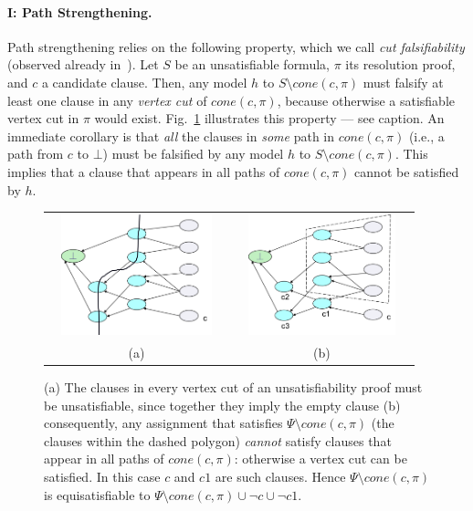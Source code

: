 \documentclass[twoside,11pt]{article}
\renewcommand\square{\bot}
\renewcommand\Pr{\pi}
\begin{document}
\algrenewcommand\algorithmicindent{1em}

\paragraph{I: Path Strengthening.} Path strengthening relies on
the following property, which we call \emph{cut falsifiability} (observed
already in~\cite{DHN06,NadelPhd}). Let $S$ be an unsatisfiable formula, $\pi$
its resolution proof, and $c$ a candidate clause.
Then, any model $h$ to $S \setminus cone(c,\Pr)$ must falsify at least one clause
in any \emph{vertex cut} of $cone(c,\Pr)$, because otherwise a satisfiable vertex
cut in $\pi$ would exist. Fig.~\ref{fig:pf} illustrates this property --- see
caption. An immediate corollary is that \emph{all} the clauses in \emph{some}
path in $cone(c,\Pr)$ (i.e., a path from $c$ to $\square$) must be falsified by
any model $h$ to $S \setminus cone(c,\Pr)$. This implies that a clause that
appears in all paths of $cone(c,\Pr)$ cannot be satisfied by $h$.

\begin{figure}
\begin{center}
\begin{tabular}{cc}
\begin{minipage}{8 cm}
\includegraphics[height=35mm, width = 50mm]{pf.png}
\end{minipage}
&
\begin{minipage}{8 cm}
\includegraphics[height=35mm, width = 50mm]{picture1.png}
\end{minipage}
\\
(a) & (b)\\
\end{tabular}
\caption{(a) The clauses in every vertex cut of an unsatisfiability proof must be unsatisfiable, since together they imply the empty clause
(b) consequently, any assignment that satisfies $\Psi \setminus cone(c,\Pr)$ (the clauses within the dashed polygon) \emph{cannot} satisfy clauses
that appear in all paths of $cone(c,\Pr)$:
otherwise a vertex cut can be satisfied. In this case $c$ and $c1$ are such clauses.
Hence $\Psi \setminus cone(c,\Pr)$ is equisatisfiable to $\Psi \setminus cone(c,\Pr) \cup \lnot c \cup \lnot c1$.
}\label{fig:pf}
\end{center}
\end{figure}
\end{document}
